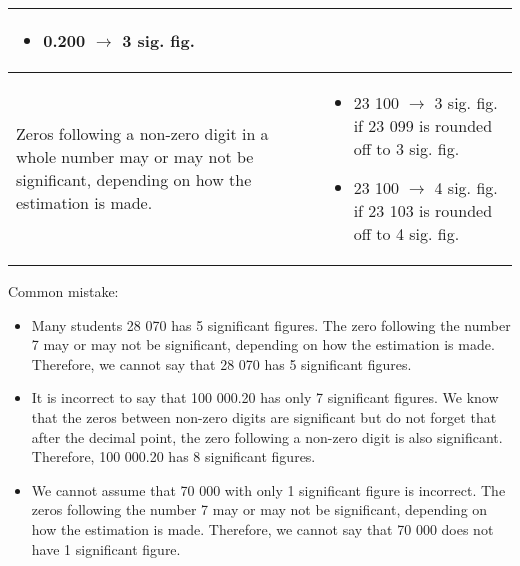 \documentclass[../main]{subfiles}
\begin{document}
\begin{center}
\begin{tabular}{|p{4cm} | p{4cm} |}
\begin{itemize}
                                                                               \item  0.200 \(\rightarrow\) 3 sig. fig.
                                                                               \end{itemize} \\ \hline
    Zeros following a non-zero digit in a whole number may or may not be significant, depending on how the estimation is made.
    &
      \begin{itemize}
      \item  23 100 \(\rightarrow\) 3 sig. fig. if 23 099 is rounded off to 3 sig. fig.
      \item  23 100 \(\rightarrow\) 4 sig. fig. if 23 103 is rounded off to 4 sig. fig.
      \end{itemize} \\ \hline

  \end{tabular}
\end{center}

Common mistake:
\begin{itemize}
\item Many students 28 070 has 5 significant figures. The zero following the number 7 may or
  may not be significant, depending on how the estimation is made. Therefore, we
  cannot say that 28 070 has 5 significant figures.
\item It is incorrect to say that 100 000.20 has only 7 significant figures. We
  know that the zeros between non-zero digits are significant but do not forget
  that after the decimal point, the zero following a non-zero digit is also
  significant. Therefore, 100 000.20 has 8 significant figures.
 
\item We cannot assume that 70 000 with only 1 significant figure is incorrect.
  The zeros following the number 7 may or may not be significant, depending on
  how the estimation is made. Therefore, we cannot say that 70 000 does not have
  1 significant figure. 
\end{itemize}
\end{document}
